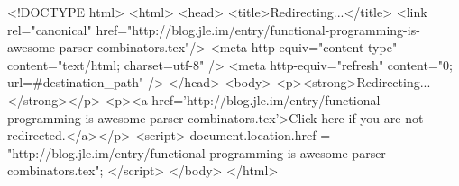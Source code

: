<!DOCTYPE html>
<html>
<head>
<title>Redirecting...</title>
<link rel="canonical" href="http://blog.jle.im/entry/functional-programming-is-awesome-parser-combinators.tex"/>
<meta http-equiv="content-type" content="text/html; charset=utf-8" />
<meta http-equiv="refresh" content="0; url=#{destination_path}" />
</head>
<body>
  <p><strong>Redirecting...</strong></p>
  <p><a href='http://blog.jle.im/entry/functional-programming-is-awesome-parser-combinators.tex'>Click here if you are not redirected.</a></p>
  <script>
    document.location.href = "http://blog.jle.im/entry/functional-programming-is-awesome-parser-combinators.tex";
  </script>
</body>
</html>

